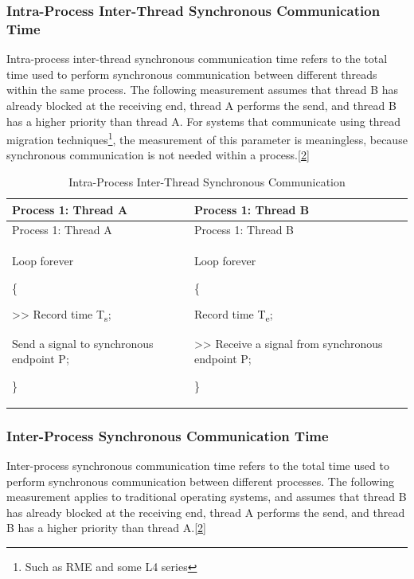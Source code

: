 \subsubsection{Intra-Process Inter-Thread Synchronous Communication Time}\label{subsubsec:1-intra-process-sync-communication}

Intra-process inter-thread synchronous communication time refers to the total time used to perform synchronous communication between different threads within the same process. The following measurement assumes that thread B has already blocked at the receiving end, thread A performs the send, and thread B has a higher priority than thread A. For systems that communicate using thread migration techniques\footnote{Such as RME and some L4 series}, the measurement of this parameter is meaningless, because synchronous communication is not needed within a process.\hyperref[cite:1-2]{{[}2{]}}

\begin{xltabular}{\textwidth}{@{}>{\hsize\raggedright\arraybackslash}X>{\hsize\raggedright\arraybackslash}X@{}}
\caption{Intra-Process Inter-Thread Synchronous Communication}\label{tab:1-5-intra-process-sync-communication}\\
\toprule
Process 1: Thread A & Process 1: Thread B\tabularnewline
\endfirsthead
\toprule
Process 1: Thread A & Process 1: Thread B\tabularnewline
\midrule
\endhead
\bottomrule
\endlastfoot
Loop forever

\{

\textgreater\textgreater{} Record time T\textsubscript{s};

Send a signal to synchronous endpoint P;

\}\strut
 & Loop forever

\{

Record time T\textsubscript{e};

\textgreater\textgreater{} Receive a signal from synchronous endpoint P;

\}\strut
\tabularnewline
\end{xltabular}
\nopagebreak[4]

\subsubsection{Inter-Process Synchronous Communication Time}\label{subsubsec:1-inter-process-sync-communication}

Inter-process synchronous communication time refers to the total time used to perform synchronous communication between different processes. The following measurement applies to traditional operating systems, and assumes that thread B has already blocked at the receiving end, thread A performs the send, and thread B has a higher priority than thread A.\hyperref[cite:1-2]{{[}2{]}}

